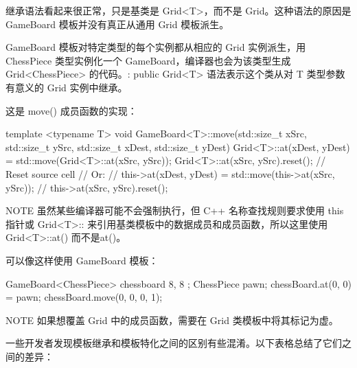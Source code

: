 继承语法看起来很正常，只是基类是 Grid<T>，而不是 Grid。这种语法的原因是 GameBoard 模板并没有真正从通用 Grid 模板派生。

GameBoard 模板对特定类型的每个实例都从相应的 Grid 实例派生，用 ChessPiece 类型实例化一个 GameBoard，编译器也会为该类型生成 Grid<ChessPiece> 的代码。: public Grid<T> 语法表示这个类从对 T 类型参数有意义的 Grid 实例中继承。

这是 move() 成员函数的实现：

\begin{cpp}
template <typename T>
void GameBoard<T>::move(std::size_t xSrc, std::size_t ySrc,
    std::size_t xDest, std::size_t yDest)
{
    Grid<T>::at(xDest, yDest) = std::move(Grid<T>::at(xSrc, ySrc));
    Grid<T>::at(xSrc, ySrc).reset(); // Reset source cell
    // Or:
    // this->at(xDest, yDest) = std::move(this->at(xSrc, ySrc));
    // this->at(xSrc, ySrc).reset();
}
\end{cpp}

\begin{myNotic}{NOTE}
虽然某些编译器可能不会强制执行，但 C++ 名称查找规则要求使用 this 指针或 Grid<T>:: 来引用基类模板中的数据成员和成员函数，所以这里使用 Grid<T>::at() 而不是at()。
\end{myNotic}

可以像这样使用 GameBoard 模板：

\begin{cpp}
GameBoard<ChessPiece> chessboard { 8, 8 };
ChessPiece pawn;
chessBoard.at(0, 0) = pawn;
chessBoard.move(0, 0, 0, 1);
\end{cpp}

\begin{myNotic}{NOTE}
如果想覆盖 Grid 中的成员函数，需要在 Grid 类模板中将其标记为虚。
\end{myNotic}


一些开发者发现模板继承和模板特化之间的区别有些混淆。以下表格总结了它们之间的差异：

